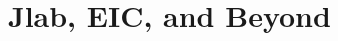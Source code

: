 \label{Chapter-12}

\hypertarget{Section-12.1}{%
\section{Jlab, EIC, and Beyond}\label{Section-12.1}}



